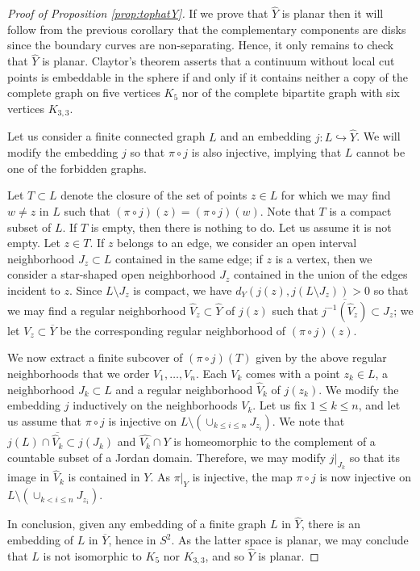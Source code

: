\documentclass[11pt]{article}
\theoremstyle{definition}
\renewcommand\hat{\widehat}
\begin{document}
\begin{proof}[Proof of Proposition \ref{prop:tophatY}] If we prove that $\hat{Y}$ is planar then it will follow from the previous corollary that the complementary components are disks since the boundary curves are non-separating. Hence, 
it only remains to check that $\hat{Y}$ is planar. 
Claytor's theorem \cite{claytor} asserts that a continuum without local cut points is embeddable in the sphere  if and only if it contains neither a copy of the complete graph on five vertices $K_5$ nor of the complete bipartite graph  with six vertices $K_{3,3}$. 

Let us consider a finite connected 
graph $L$ and an embedding $j:L\hookrightarrow \hat{Y}$. We will modify the embedding $j$ so that $\pi\circ j$ is also injective, implying that $L$ cannot be one of the forbidden graphs.

Let $T\subset L$ denote the closure of the set of points $z\in L$ for which we may find $w\ne z$ in $L$ such that $(\pi\circ j) (z)= (\pi\circ j) (w)$. Note that $T$ is a compact subset of $L$.
If $T$ is empty, then there is nothing to do.
Let us assume it is not empty.
 Let $z\in T$. If $z$ belongs to an edge, we consider an open interval neighborhood $J_z\subset L$ contained in the same
edge; if $z$ is a vertex, then we consider a star-shaped open neighborhood $J_z$ contained in the union of the edges incident to $z$. Since $L\setminus J_z$
is compact, we have $d_Y(j(z), j(L\setminus J_z))>0$ so that we may find a regular neighborhood $\hat{V}_z\subset \hat{Y}$ of $j(z)$ such that $\overline{j^{-1}(\hat{V}_z) }\subset J_z$; we let
$V_z\subset \overline{Y}$ be the corresponding regular neighborhood of $(\pi\circ j)(z)$. 

We now extract a finite subcover of $(\pi\circ j)(T)$ given by the above regular neighborhoods that we order $V_1,\ldots, V_n$. Each $V_k$ comes with a point $z_k\in L$, a neighborhood $J_k\subset L$ and a regular
neighborhood $\hat{V}_k$ of $j(z_k)$. We modify the embedding $j$ inductively on the neighborhoods $V_k$. Let us fix $1\le k\le n$, and let us assume that $\pi\circ j$ is injective  on $L\setminus ( \cup_{k\le i\le n} J_{z_i} )$.
We note that $j(L)\cap \overline{\hat{V}_k}\subset j(J_k)$ and $\hat{V_k}\cap Y$ is homeomorphic to the complement of a countable subset of a Jordan domain. Therefore, we may modify $j|_{J_k}$ 
so that its image in $\hat{V}_k$ is contained in $Y$. As $\pi|_Y$ is injective, the map  $\pi\circ j$ is now injective  on $L\setminus ( \cup_{k< i\le n} J_{z_i} )$. 

In conclusion, given any embedding of a finite graph $L$ in $\hat{Y}$, there is an embedding of $L$ in $\overline{Y}$, hence in $S^2$. As the latter space is planar, we may conclude that $L$ is not isomorphic to
$K_5$ nor $K_{3,3}$, and so $\hat{Y}$ is planar. 
\end{proof}
\end{document}
